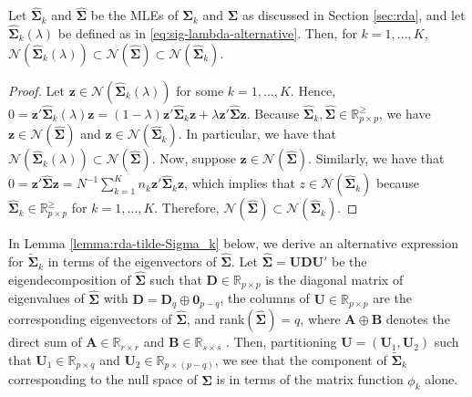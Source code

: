 \documentclass[11pt]{article}
\begin{document}
\begin{lemma}\label{lemma:null-spaces}
Let $\widehat{\bm \Sigma}_k$ and $\widehat{\bm \Sigma}$ be the MLEs of $\bm \Sigma_k$ and $\bm \Sigma$ as discussed in Section \ref{sec:rda}, and let $\widehat{\bm \Sigma}_k(\lambda)$ be defined as in \eqref{eq:sig-lambda-alternative}. Then, for $k = 1, \ldots, K$, $\mathcal{N}(\widehat{\bm \Sigma}_k(\lambda)) \subset \mathcal{N}(\widehat{\bm \Sigma}) \subset \mathcal{N}(\widehat{\bm \Sigma}_k)$.
\end{lemma}
\begin{proof}
Let $\bm z \in \mathcal{N}(\widehat{\bm \Sigma}_k(\lambda))$ for some $k = 1, \ldots, K$. Hence, $0 = \bm z' \widehat{\bm \Sigma}_k(\lambda) \bm z = (1 - \lambda) \bm z' \widehat{\bm \Sigma}_k \bm z + \lambda \bm z' \widehat{\bm \Sigma} \bm z$. Because $\widehat{\bm \Sigma}_k, \widehat{\bm \Sigma}\in \mathbb{R}_{p \times p}^{\ge}$, we have $\bm z \in \mathcal{N}(\widehat{\bm \Sigma})$ and $\bm z \in \mathcal{N}(\widehat{\bm \Sigma}_k)$. In particular, we have that $\mathcal{N}(\widehat{\bm \Sigma}_k(\lambda)) \subset \mathcal{N}(\widehat{\bm \Sigma})$. Now, suppose $\bm z \in \mathcal{N}(\widehat{\bm \Sigma})$. Similarly, we have that $0 = \bm z' \widehat{\bm \Sigma} \bm z = N^{-1} \sum_{k = 1}^K n_k \bm z' \widehat{\bm \Sigma}_k \bm z$, which implies that $z \in \mathcal{N}(\widehat{\bm \Sigma}_k)$ because $\widehat{\bm \Sigma}_k \in \mathbb{R}_{p \times p}^{\ge}$ for $k = 1, \ldots, K$. Therefore, $\mathcal{N}(\widehat{\bm \Sigma}) \subset \mathcal{N}(\widehat{\bm \Sigma}_k)$.
\end{proof}

In Lemma \ref{lemma:rda-tilde-Sigma_k} below, we derive an alternative expression for $\tilde{\bm \Sigma}_k$ in terms of the eigenvectors of $\widehat{\bm \Sigma}$. Let $\widehat{\bm \Sigma} = \bm U \bm D \bm U'$ be the eigendecomposition of $\widehat{\bm \Sigma}$ such that $\bm D \in \mathbb{R}_{p \times p}$ is the diagonal matrix of eigenvalues of $\widehat{\bm \Sigma}$ with $\bm D = \bm D_q \oplus \bm 0_{p-q}$, the columns of $\bm U \in \mathbb{R}_{p \times p}$ are the corresponding eigenvectors of $\widehat{\bm \Sigma}$, and rank$(\widehat{\bm \Sigma}) = q$, where $\bm A \oplus \bm B$ denotes the direct sum of $\bm A \in \mathbb{R}_{r \times r}$ and $\bm B \in \mathbb{R}_{s \times s}$ \citep[Chapter 1]{Lutkepohl:1996uz}. Then, partitioning $\bm U = (\bm U_1, \bm U_2)$ such that $\bm U_1 \in \mathbb{R}_{p \times q}$ and $\bm U_2 \in \mathbb{R}_{p \times (p - q)}$, we see that the component of $\tilde{\bm \Sigma}_k$ corresponding to the null space of $\widehat{\bm \Sigma}$ is in terms of the matrix function $\phi_k$ alone.
\end{document}
